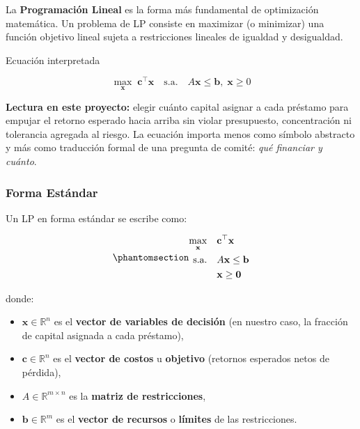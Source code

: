 \documentclass[
  spanish,
  11pt,
  letterpaper,
]{scrbook}
\providecommand{\tightlist}{%
  \setlength{\itemsep}{0pt}\setlength{\parskip}{0pt}}
\theoremstyle{plain}
\theoremstyle{remark}
\begin{document}
La \textbf{Programación Lineal} es la forma más fundamental de
optimización matemática. Un problema de LP consiste en maximizar (o
minimizar) una función objetivo lineal sujeta a restricciones lineales
de igualdad y desigualdad.

{Ecuación interpretada}

\[
\max_{\mathbf{x}} \; \mathbf{c}^{\top}\mathbf{x}
\quad \text{s.a.} \quad
A\mathbf{x}\leq\mathbf{b}, \; \mathbf{x}\geq 0
\]

\textbf{Lectura en este proyecto:} elegir cuánto capital asignar a cada
préstamo para empujar el retorno esperado hacia arriba sin violar
presupuesto, concentración ni tolerancia agregada al riesgo. La ecuación
importa menos como símbolo abstracto y más como traducción formal de una
pregunta de comité: \emph{qué financiar y cuánto}.

\subsubsection{Forma Estándar}\label{forma-estuxe1ndar}

Un LP en forma estándar se escribe como:

\begin{equation}\protect\phantomsection\label{eq-lp-standard}{
\begin{aligned}
\max_{\mathbf{x}} \quad & \mathbf{c}^\top \mathbf{x} \\
\text{s.a.} \quad & A\mathbf{x} \leq \mathbf{b} \\
& \mathbf{x} \geq \mathbf{0}
\end{aligned}
}\end{equation}

donde:

\begin{itemize}
\tightlist
\item
  \(\mathbf{x} \in \mathbb{R}^n\) es el \textbf{vector de variables de
  decisión} (en nuestro caso, la fracción de capital asignada a cada
  préstamo),
\item
  \(\mathbf{c} \in \mathbb{R}^n\) es el \textbf{vector de costos} u
  \textbf{objetivo} (retornos esperados netos de pérdida),
\item
  \(A \in \mathbb{R}^{m \times n}\) es la \textbf{matriz de
  restricciones},
\item
  \(\mathbf{b} \in \mathbb{R}^m\) es el \textbf{vector de recursos} o
  \textbf{límites} de las restricciones.
\end{itemize}
\end{document}
